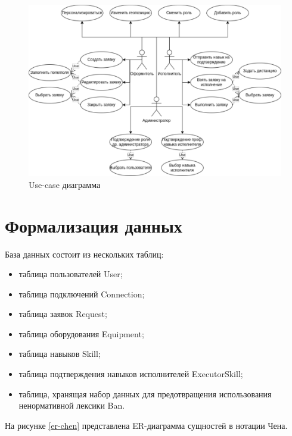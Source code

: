 \begin{figure}[H]
	\begin{center}
		\includegraphics[page=1,scale=0.8]{assets/use-case.pdf}
	\end{center}
	\caption{Use-case диаграмма}
	\label{use-case}
\end{figure}

\section{Формализация данных}

База данных состоит из нескольких таблиц:
\begin{itemize}
	\item таблица пользователей User;
	\item таблица подключений Connection;
	\item таблица заявок Request;
	\item таблица оборудования Equipment;
	\item таблица навыков Skill;
	\item таблица подтверждения навыков исполнителей ExecutorSkill;
	\item таблица, хранящая набор данных для предотвращения использования ненормативной лексики Ban.
\end{itemize}
На рисунке \ref{er-chen} представлена ER-диаграмма сущностей в нотации Чена.


